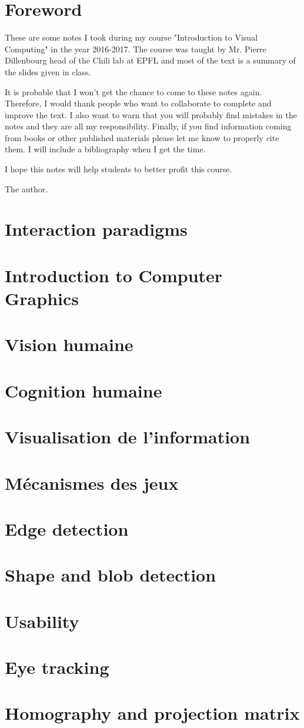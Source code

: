 \documentclass[a4paper,11pt]{article}
\theoremstyle{example-style}
\begin{document}
\maketitle
\tableofcontents
\newpage
\section{Foreword}

These are some notes I took during my course "Introduction to Visual Computing" in the year 2016-2017. The course was taught by Mr. Pierre Dillenbourg head of the Chili lab at EPFL and most of the text is a summary of the slides given in class.

It is probable that I won't get the chance to come to these notes again. Therefore, I would thank people who want to collaborate to complete and improve the text. I also want to warn that you will probably find mistakes in the notes and they are all my responsibility. Finally, if you find information coming from books or other published materials please let me know to properly cite them. I will include a bibliography when I get the time.

I hope this notes will help students to better profit this course. 

\hfill The author.
\newpage
\section{Interaction paradigms}

\section{Introduction to Computer Graphics}

\section{Vision humaine}

\section{Cognition humaine}

\section{Visualisation de l'information}

\section{M\'ecanismes des jeux}

\section{Edge detection}

\section{Shape and blob detection}

\section{Usability}

\section{Eye tracking}

\section{Homography and projection matrix}

\end{document}
